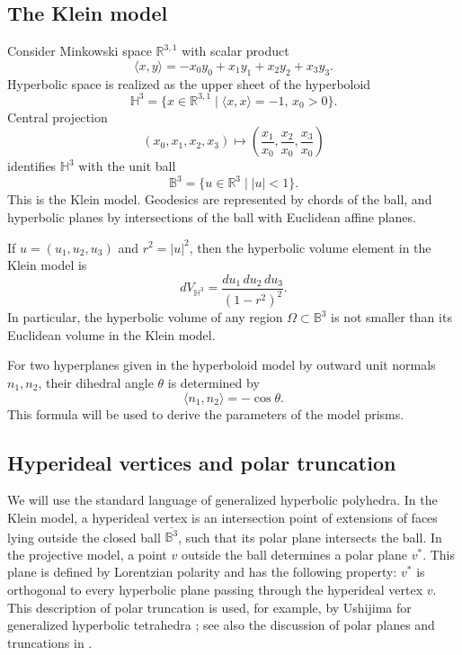 \documentclass[12pt,a4paper]{article}
\theoremstyle{definition}
\newcommand{\HH}{\mathbb H}
\newcommand{\RR}{\mathbb R}
\begin{document}
\subsection{The Klein model}

Consider Minkowski space \(\RR^{3,1}\) with scalar product
\[
        \langle x,y\rangle=-x_0y_0+x_1y_1+x_2y_2+x_3y_3.
\]
Hyperbolic space is realized as the upper sheet of the hyperboloid
\[
        \HH^3=\{x\in\RR^{3,1}\mid \langle x,x\rangle=-1,\, x_0>0\}.
\]
Central projection
\[
        (x_0,x_1,x_2,x_3)\longmapsto
        \left(\frac{x_1}{x_0},\frac{x_2}{x_0},\frac{x_3}{x_0}\right)
\]
identifies \(\HH^3\) with the unit ball
\[
        \mathbb B^3=\{u\in\RR^3\mid |u|<1\}.
\]
This is the Klein model. Geodesics are represented by chords of the ball, and hyperbolic planes by intersections of the ball with Euclidean affine planes.

If \(u=(u_1,u_2,u_3)\) and \(r^2=|u|^2\), then the hyperbolic volume element in the Klein model is
\begin{equation}\label{eq:klein-volume-element}
        dV_{\HH^3}=\frac{du_1\,du_2\,du_3}{(1-r^2)^2}.
\end{equation}
In particular, the hyperbolic volume of any region \(\Omega\subset\mathbb B^3\) is not smaller than its Euclidean volume in the Klein model.

For two hyperplanes given in the hyperboloid model by outward unit normals \(n_1,n_2\), their dihedral angle \(\theta\) is determined by
\[
        \langle n_1,n_2\rangle=-\cos\theta.
\]
This formula will be used to derive the parameters of the model prisms.

\subsection{Hyperideal vertices and polar truncation}

We will use the standard language of generalized hyperbolic polyhedra. In the Klein model, a hyperideal vertex is an intersection point of extensions of faces lying outside the closed ball \(\overline{\mathbb B^3}\), such that its polar plane intersects the ball. In the projective model, a point \(v\) outside the ball determines a polar plane \(v^*\). This plane is defined by Lorentzian polarity and has the following property: \(v^*\) is orthogonal to every hyperbolic plane passing through the hyperideal vertex \(v\). This description of polar truncation is used, for example, by Ushijima for generalized hyperbolic tetrahedra \cite[Section~2]{Ushijima2006}; see also the discussion of polar planes and truncations in \cite[Section~2]{VesninEgorovUpper}.
\end{document}
